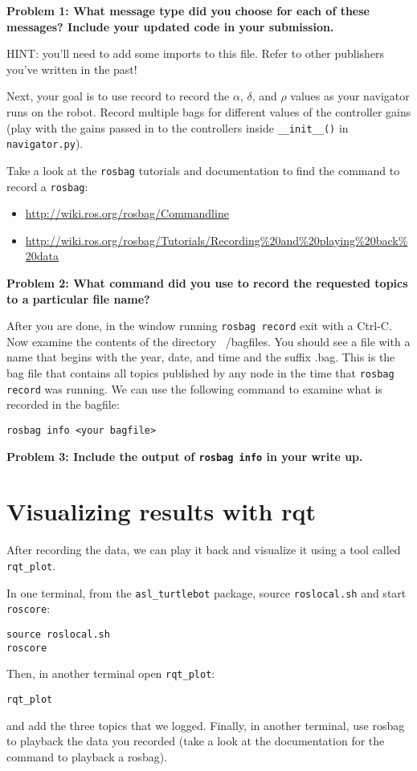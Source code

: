 \documentclass{article}
\begin{document}
\textbf{Problem 1: What message type did you choose for each of these messages? Include your updated code in your submission.}

HINT: you'll need to add some imports to this file. Refer to other publishers you've written in the past!

Next, your goal is to use record to record the $\alpha$, $\delta$, and $\rho$ values as your navigator runs on the robot. 
Record multiple bags for different values of the controller gains (play with the gains passed in to the controllers inside \texttt{\_\_init\_\_()} in \texttt{navigator.py}).

Take a look at the 
\texttt{rosbag} tutorials and documentation to find the command to record a \texttt{rosbag}:
\begin{itemize}
    \item \url{http://wiki.ros.org/rosbag/Commandline}
    \item \url{http://wiki.ros.org/rosbag/Tutorials/Recording\%20and\%20playing\%20back\%20data}
\end{itemize}

\textbf{Problem 2: What command did you use to record the requested topics to a particular file name?}

After you are done, in the window  running \texttt{rosbag record} exit with a Ctrl-C. Now examine the contents of the directory ~/bagfiles. You should see a file with a name that begins with the year, date, and time and the suffix .bag. This is the bag file that contains all topics published by any node in the time that \texttt{rosbag record} was running.
We can use the following command to examine what is recorded in the bagfile:
\begin{lstlisting}
rosbag info <your bagfile>
\end{lstlisting}

\textbf{Problem 3: Include the output of \texttt{rosbag info} in your write up.}
\section{Visualizing results with rqt}
After recording the data, we can play it back and visualize it using a tool called \texttt{rqt\_plot}. 

In one terminal, from the \texttt{asl\_turtlebot} package, source \texttt{roslocal.sh} and start \texttt{roscore}:
\begin{lstlisting}
source roslocal.sh
roscore
\end{lstlisting}
Then, in another terminal open \texttt{rqt\_plot}:
\begin{lstlisting}
rqt_plot
\end{lstlisting}
and add the three topics that we logged. 
Finally, in another terminal, use rosbag to playback the data you recorded (take a look at the documentation for the command to playback a rosbag).
\end{document}
